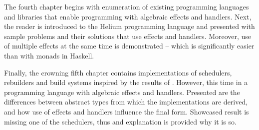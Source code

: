 The fourth chapter begins with enumeration of existing programming languages and libraries that enable programming with algebraic effects and handlers. Next, the reader is introduced to the Helium programming language and presented with sample problems and their solutions that use effects and handlers. Moreover, use of multiple effects at the same time is demonstrated -- which is significantly easier than with monads in Haskell.

Finally, the crowning fifth chapter contains implementations of schedulers, rebuilders and build systems inspired by the results of \BSaLC{}. However, this time in a programming language with algebraic effects and handlers. Presented are the differences between abstract types from which the implementations are derived, and how use of effects and handlers influence the final form. Showcased result is missing one of the schedulers, thus and explanation is provided why it is so.
